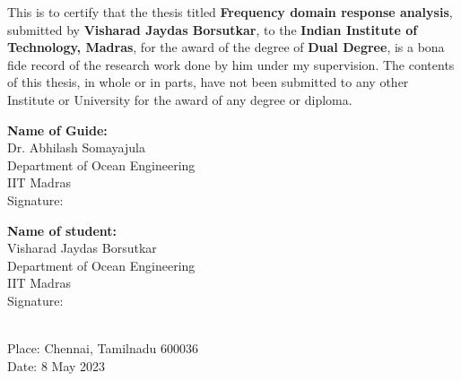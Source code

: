\certificate


This is to certify that the thesis titled {\bf  Frequency domain response analysis}, 
submitted by {\bf Visharad Jaydas Borsutkar}, to the
 {\bf Indian Institute of Technology, Madras}, for the award of the degree of 
 {\bf Dual Degree}, is a bona fide record of the research work done by him under my 
 supervision. The contents of this thesis, in whole or in parts, have not been submitted 
 to any other Institute or University for the award of any degree or diploma.
\\[2.5cm]


\begin{minipage}[t]{0.45\textwidth}
    \textbf{Name of Guide:} \\
    Dr. Abhilash Somayajula\\
    Department of Ocean Engineering\\
    IIT Madras\\

    \vspace{1em}
    Signature:

\end{minipage}%
\hspace{1cm}
\begin{minipage}[t]{0.45\textwidth}
    \textbf{Name of student:} \\
    Visharad Jaydas Borsutkar \\
    Department of Ocean Engineering\\
    IIT Madras\\

    \vspace{1em}
    Signature:
\end{minipage}
\\[2cm]

\noindent Place: Chennai, Tamilnadu 600036\\
Date: 8 May 2023  